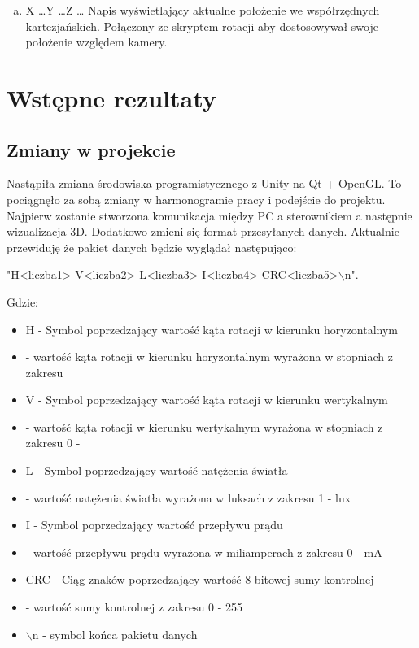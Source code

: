 \documentclass[10pt, a4paper]{article}
\begin{document}
\begin{enumerate}[I.]
\begin{enumerate}[a)]
				\item X \dots Y \dots Z \dots
				\newline	
				Napis wyświetlający aktualne położenie we współrzędnych kartezjańskich. Połączony ze skryptem rotacji aby dostosowywał swoje położenie względem kamery.
			\end{enumerate}
		\end{enumerate}
			
\newpage
\section{Wstępne rezultaty}
		\subsection{Zmiany w projekcie}
		Nastąpiła zmiana środowiska programistycznego z Unity na Qt + OpenGL. To pociągnęło za sobą zmiany w harmonogramie pracy i podejście do projektu. Najpierw zostanie stworzona komunikacja między PC a sterownikiem a następnie wizualizacja 3D. Dodatkowo zmieni się format przesyłanych danych. Aktualnie przewiduję że pakiet danych będzie wyglądał następująco: 
		\begin{center}
			"H<liczba1> V<liczba2> L<liczba3> I<liczba4> CRC<liczba5>$\backslash$n".
		\end{center}
		Gdzie:
		\begin{itemize}
			\item H - Symbol poprzedzający wartość kąta rotacji w kierunku horyzontalnym
			\item <liczba1> - wartość kąta rotacji w kierunku horyzontalnym wyrażona w stopniach z zakresu \newline \unit[0 - 360]{\textdegree}
			\item V - Symbol poprzedzający wartość kąta rotacji w kierunku wertykalnym
			\item <liczba2> - wartość kąta rotacji w kierunku wertykalnym wyrażona w stopniach z zakresu 0 - \unit[180]{\textdegree}
			\item L - Symbol poprzedzający wartość natężenia światła
			\item <liczba3> - wartość natężenia światła wyrażona w luksach z zakresu 1 - \unit[65535]{lux}
			\item I - Symbol poprzedzający wartość przepływu prądu
			\item <liczba4> - wartość przepływu prądu wyrażona w miliamperach z zakresu 0 - \unit[65535]{mA}
			\item CRC - Ciąg znaków poprzedzający wartość 8-bitowej sumy kontrolnej
			\item <liczba5> - wartość sumy kontrolnej z zakresu 0 - 255
			\item $\backslash$n - symbol końca pakietu danych
		\end{itemize}
		
\end{document}
